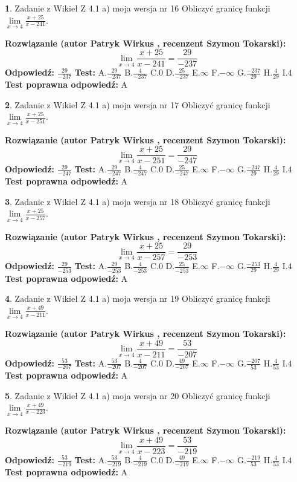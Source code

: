 \documentclass[12pt, a4paper]{article}
\theoremstyle{definition} %
\newtheorem{zad}{}
\newcommand{\zadStart}[1]{\begin{zad}#1\newline}
\newcommand{\zadStop}{\end{zad}}
\newcommand{\rozwStart}[2]{\noindent \textbf{Rozwiązanie (autor #1 , recenzent #2): }\newline}
\newcommand{\rozwStop}{\newline}
\newcommand{\odpStart}{\noindent \textbf{Odpowiedź:}\newline}
\newcommand{\odpStop}{\newline}
\newcommand{\testStart}{\noindent \textbf{Test:}\newline}
\newcommand{\testStop}{\newline}
\newcommand{\kluczStart}{\noindent \textbf{Test poprawna odpowiedź:}\newline}
\newcommand{\kluczStop}{\newline}
\begin{document}
\zadStart{Zadanie z Wikieł Z 4.1 a) moja wersja nr 16}
Obliczyć granicę funkcji $\lim\limits_{x\to4}\frac{x+25}{x-241}$.
\zadStop
\rozwStart{Patryk Wirkus}{Szymon Tokarski}
$$\lim\limits_{x\to4}\frac{x+25}{x-241} = \frac{29}{-237}$$
\rozwStop
\odpStart
$\frac{29}{-237}$
\odpStop
\testStart
A.$\frac{29}{-237}$
B.$\frac{4}{-237}$
C.$0$
D.$\frac{25}{-237}$
E.$\infty$
F.$-\infty$
G.$\frac{-237}{29}$
H.$\frac{4}{29}$
I.$4$
\testStop
\kluczStart
A
\kluczStop



\zadStart{Zadanie z Wikieł Z 4.1 a) moja wersja nr 17}
Obliczyć granicę funkcji $\lim\limits_{x\to4}\frac{x+25}{x-251}$.
\zadStop
\rozwStart{Patryk Wirkus}{Szymon Tokarski}
$$\lim\limits_{x\to4}\frac{x+25}{x-251} = \frac{29}{-247}$$
\rozwStop
\odpStart
$\frac{29}{-247}$
\odpStop
\testStart
A.$\frac{29}{-247}$
B.$\frac{4}{-247}$
C.$0$
D.$\frac{25}{-247}$
E.$\infty$
F.$-\infty$
G.$\frac{-247}{29}$
H.$\frac{4}{29}$
I.$4$
\testStop
\kluczStart
A
\kluczStop



\zadStart{Zadanie z Wikieł Z 4.1 a) moja wersja nr 18}
Obliczyć granicę funkcji $\lim\limits_{x\to4}\frac{x+25}{x-257}$.
\zadStop
\rozwStart{Patryk Wirkus}{Szymon Tokarski}
$$\lim\limits_{x\to4}\frac{x+25}{x-257} = \frac{29}{-253}$$
\rozwStop
\odpStart
$\frac{29}{-253}$
\odpStop
\testStart
A.$\frac{29}{-253}$
B.$\frac{4}{-253}$
C.$0$
D.$\frac{25}{-253}$
E.$\infty$
F.$-\infty$
G.$\frac{-253}{29}$
H.$\frac{4}{29}$
I.$4$
\testStop
\kluczStart
A
\kluczStop



\zadStart{Zadanie z Wikieł Z 4.1 a) moja wersja nr 19}
Obliczyć granicę funkcji $\lim\limits_{x\to4}\frac{x+49}{x-211}$.
\zadStop
\rozwStart{Patryk Wirkus}{Szymon Tokarski}
$$\lim\limits_{x\to4}\frac{x+49}{x-211} = \frac{53}{-207}$$
\rozwStop
\odpStart
$\frac{53}{-207}$
\odpStop
\testStart
A.$\frac{53}{-207}$
B.$\frac{4}{-207}$
C.$0$
D.$\frac{49}{-207}$
E.$\infty$
F.$-\infty$
G.$\frac{-207}{53}$
H.$\frac{4}{53}$
I.$4$
\testStop
\kluczStart
A
\kluczStop



\zadStart{Zadanie z Wikieł Z 4.1 a) moja wersja nr 20}
Obliczyć granicę funkcji $\lim\limits_{x\to4}\frac{x+49}{x-223}$.
\zadStop
\rozwStart{Patryk Wirkus}{Szymon Tokarski}
$$\lim\limits_{x\to4}\frac{x+49}{x-223} = \frac{53}{-219}$$
\rozwStop
\odpStart
$\frac{53}{-219}$
\odpStop
\testStart
A.$\frac{53}{-219}$
B.$\frac{4}{-219}$
C.$0$
D.$\frac{49}{-219}$
E.$\infty$
F.$-\infty$
G.$\frac{-219}{53}$
H.$\frac{4}{53}$
I.$4$
\testStop
\kluczStart
A
\kluczStop
\end{document}
